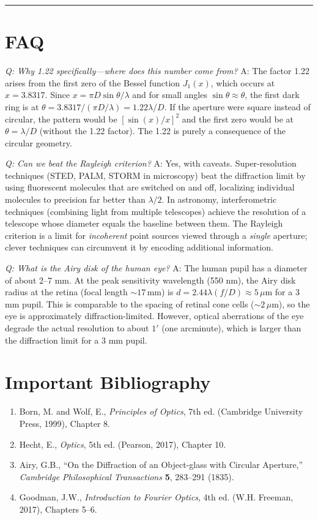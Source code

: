 \bigskip
\hrule
\bigskip
\section*{FAQ}

\textit{Q: Why 1.22 specifically---where does this number come from?}
A: The factor 1.22 arises from the first zero of the Bessel function $J_1(x)$, which occurs at $x = 3.8317$. Since $x = \pi D\sin\theta/\lambda$ and for small angles $\sin\theta \approx \theta$, the first dark ring is at $\theta = 3.8317/(\pi D/\lambda) = 1.22\lambda/D$. If the aperture were square instead of circular, the pattern would be $[\sin(x)/x]^2$ and the first zero would be at $\theta = \lambda/D$ (without the 1.22 factor). The 1.22 is purely a consequence of the circular geometry.

\textit{Q: Can we beat the Rayleigh criterion?}
A: Yes, with caveats. Super-resolution techniques (STED, PALM, STORM in microscopy) beat the diffraction limit by using fluorescent molecules that are switched on and off, localizing individual molecules to precision far better than $\lambda/2$. In astronomy, interferometric techniques (combining light from multiple telescopes) achieve the resolution of a telescope whose diameter equals the baseline between them. The Rayleigh criterion is a limit for \emph{incoherent} point sources viewed through a \emph{single} aperture; clever techniques can circumvent it by encoding additional information.

\textit{Q: What is the Airy disk of the human eye?}
A: The human pupil has a diameter of about 2--7 mm. At the peak sensitivity wavelength (550 nm), the Airy disk radius at the retina (focal length $\sim 17\,\text{mm}$) is $d = 2.44\lambda(f/D) \approx 5\,\mu\text{m}$ for a 3 mm pupil. This is comparable to the spacing of retinal cone cells ($\sim 2\,\mu\text{m}$), so the eye is approximately diffraction-limited. However, optical aberrations of the eye degrade the actual resolution to about $1'$ (one arcminute), which is larger than the diffraction limit for a 3 mm pupil.
\section*{Important Bibliography}
\begin{enumerate}
\item Born, M. and Wolf, E., \textit{Principles of Optics}, 7th ed. (Cambridge University Press, 1999), Chapter 8.
\item Hecht, E., \textit{Optics}, 5th ed. (Pearson, 2017), Chapter 10.
\item Airy, G.B., ``On the Diffraction of an Object-glass with Circular Aperture,'' \textit{Cambridge Philosophical Transactions} \textbf{5}, 283--291 (1835).
\item Goodman, J.W., \textit{Introduction to Fourier Optics}, 4th ed. (W.H. Freeman, 2017), Chapters 5--6.
\end{enumerate}

